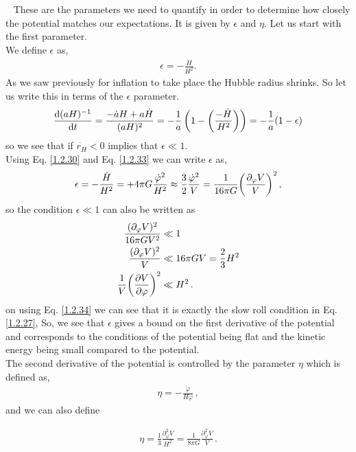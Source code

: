 \
\hspace{0.5cm} These are the parameters we need to quantify in order to determine how closely the potential matches our expectations. It is given by $\epsilon$ and $\eta$. Let us start with the first parameter.\\
We define $\epsilon$ as,
\begin{align}
    \epsilon = -\frac{\dot{H}}{H^2}. \label{1.2.34}
\end{align}
As we saw previously for inflation to take place the Hubble radius shrinks. So let us write this in terms of the $\epsilon$ parameter.
\begin{align}
    \dv{(aH)^{-1}}{t} = \frac{-\dot{a}H + a\dot{H}}{(aH)^2} = -\frac{1}{a}\left( 1- \left( \frac{-\dot{H}}{H^2}\right)\right) = -\frac{1}{a}(1 - \epsilon) \label{1.2.35}
\end{align}
so we see that if $\dot{r_H} < 0$ implies that $\epsilon \ll 1 $.\\
\hspace{0.5cm} Using Eq. \eqref{1.2.30} and Eq. \eqref{1.2.33} we can write $\epsilon$ as,
\begin{align}
    \epsilon = - \frac{\dot{H}}{H^2} = + 4 \pi G \frac{\dot{\varphi}^2}{H^2} \approx \frac{3}{2} \frac{\dot{\varphi}^2}{V} = \frac{1}{16 \pi G} \qty(\frac{\partial_{\varphi} V}{V})^2\,,\label{1.2.36}
\end{align}
so the condition $\epsilon \ll 1 $ can also be written as 
\begin{align}
    \frac{(\partial_{\varphi} V)^2}{16 \pi G V^2} &\ll 1  \\ 
    \frac{(\partial_{\varphi} V)^2}{V} &\ll 16 \pi G V = \frac{2}{3} H^2 \\ 
    \frac{1}{V} \qty(\pdv{V}{\varphi })^2 &\ll H^2\,.\label{1.2.39}
\end{align}
on using Eq. \eqref{1.2.34} we can see that it is exactly the slow roll condition in Eq. \eqref{1.2.27}, So, we see that $\epsilon$ gives a bound on the first derivative of the potential and corresponds to the conditions of the potential being flat and the kinetic energy being small compared to the potential.\\
The second derivative of the potential is controlled by the parameter $\eta$ which is defined as,
 \begin{align}
     \eta = - \frac{\ddot{\varphi}}{H \dot{\varphi}}\,, \label{1.2.40}
 \end{align}
 and we can also define 

\begin{align}
    \eta = \frac{1}{3} \frac{\partial^{2} _{\varphi} V}{H^2} = \frac{1}{8 \pi G} \frac{\partial^{2} _{\varphi} V}{V} \,. \label{1.2.41}
\end{align}

